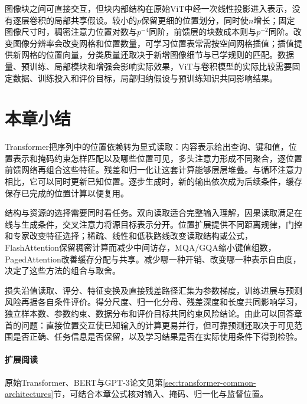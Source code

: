 图像块之间可直接交互，但块内部结构在原始ViT中经一次线性投影进入表示，没有逐层卷积的局部共享假设。较小的$p$保留更细的位置划分，同时使$n$增长；固定图像尺寸时，稠密注意力位置对数与$p^{-4}$同阶，前馈层的块数成本则与$p^{-2}$同阶。改变图像分辨率会改变网格和位置数量，可学习位置表常需按空间网格插值；插值提供新网格的位置向量，分类质量还取决于新增图像细节与已学规则的匹配。数据量、预训练、局部模块和增强会影响实际效果，ViT与卷积模型的实际比较需要固定数据、训练投入和评价目标，局部归纳假设与预训练知识共同影响结果。

\FloatBarrier
\section{本章小结}
\label{sec:transformer-summary}

Transformer把序列中的位置依赖转为显式读取：内容表示给出查询、键和值，位置表示和掩码约束怎样匹配以及哪些位置可见，多头注意力形成不同聚合，逐位置前馈网络再组合这些特征。残差和归一化让这套计算能够层层堆叠。与循环注意力相比，它可以同时更新已知位置。逐步生成时，新的输出依次成为后续条件，缓存保存已完成的位置计算以便复用。

结构与资源的选择需要同时看任务。双向读取适合完整输入理解，因果读取满足在线与生成条件，交叉注意力将源目标表示分开。位置扩展提供不同距离规律，门控和专家改变特征选择；稀疏、线性和低秩路线改变读取结构或公式，FlashAttention保留稠密计算而减少中间访存，MQA/GQA缩小键值组数，PagedAttention改善缓存分配与共享。减少哪一种开销、改变哪一种表示自由度，决定了这些方法的组合与取舍。

损失沿值读取、评分、特征变换及直接残差路径汇集为参数梯度，训练进展与预测风险再据各自条件评价。得分尺度、归一化分母、残差深度和长度共同影响学习，独立样本数、参数约束、数据分布和评价目标共同约束风险结论。由此可以回答章首的问题：直接位置交互使已知输入的计算更易并行，但可靠预测还取决于可见范围是否正确、任务信息是否保留，以及学习结果是否在实际使用条件下得到检验。

\paragraph{扩展阅读}
原始Transformer、BERT与GPT-3论文见第\ref{sec:transformer-common-architectures}节，可结合本章公式核对输入、掩码、归一化与监督位置。
